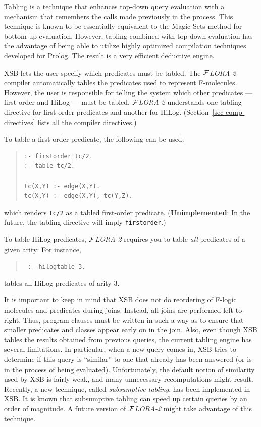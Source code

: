 \documentclass[11pt]{article}
\newcommand{\FLORA}{{\mbox{${\cal F}${\small\it LORA}\rm\emph{-2}}}\xspace}
\newcommand{\fl}{\mbox{F-logic}\xspace}
\begin{document}
%
Tabling is a technique that enhances top-down query evaluation with a
mechanism that remembers the calls made previously in the process.  This
technique is known to be essentially equivalent to the Magic Sets method
for bottom-up evaluation. However, tabling combined with top-down
evaluation has the advantage of being able to utilize highly optimized
compilation techniques developed for Prolog. The result is a very efficient
deductive engine.

XSB lets the user specify which predicates must be tabled.  The \FLORA
compiler automatically tables the predicates used to represent F-molecules.
However, the user is responsible for telling the system which other
predicates --- first-order and HiLog --- must be tabled.  \FLORA
understands one tabling directive for first-order predicates and another
for HiLog.  (Section~\ref{sec-comp-directives} lists all the compiler
directives.)

%
To table a first-order predicate, the following can be used:
\begin{quote}
\begin{verbatim}
:- firstorder tc/2.
:- table tc/2.

tc(X,Y) :- edge(X,Y).
tc(X,Y) :- edge(X,Y), tc(Y,Z).
\end{verbatim}
\end{quote}
which renders {\tt tc/2}  as a tabled first-order predicate.
({\bf Unimplemented}: In the future, the tabling directive will imply {\tt firstorder}.)

To table HiLog predicates, \FLORA requires you to table \emph{all}
predicates of a given arity: For instance,
\begin{quote}
 \tt
 :- hilogtable 3.
\end{quote}
tables all HiLog predicates of arity 3.

It is important to keep in mind that XSB does not do reordering of \fl
molecules and predicates during joins. Instead, all joins are performed
left-to-right.  Thus, program clauses must be written in such a way as to
ensure that smaller predicates and classes appear early on in the join.
Also, even though XSB tables the results obtained from previous queries,
the current tabling engine has several limitations. In particular, when a
new query comes in, XSB tries to determine if this query is ``similar'' to
one that already has been answered (or is in the process of being
evaluated).  Unfortunately, the default notion of similarity used by XSB is
fairly weak, and many unnecessary recomputations might result. Recently, a
new technique, called \emph{subsumptive tabling}, has been implemented in
XSB. It is known that subsumptive tabling can speed up certain queries by
an order of magnitude. A future version of \FLORA might take advantage of
this technique.
\end{document}
